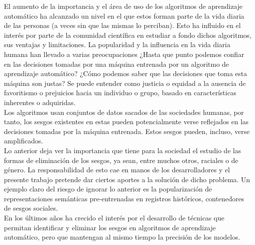 \documentclass[runningheads,a4paper]{llncs}
\begin{document}
	El aumento de la importancia y el área de uso de los algoritmos de aprendizaje automático ha alcanzado un nivel en el que estos forman parte de la vida diaria de las personas (a veces sin que las mismas lo perciban). Esto ha influido en el interés por parte de la comunidad científica en estudiar a fondo dichos algoritmos, sus ventajas y limitaciones. La popularidad y la influencia en la vida diaria humana han llevado a varias preocupaciones ¿Hasta que punto podemos confiar en las decisiones tomadas por una máquina entrenada por un algoritmo de aprendizaje automático? ¿Cómo podemos saber que las decisiones que toma esta máquina son justas? Se puede entender como justicia o equidad a la ausencia de favoritismo o prejuicios hacia un individuo o grupo, basado en características inherentes o adquiridas.\\
	Los algoritmos usan conjuntos de datos sacados de las sociedades humanas, por tanto, los sesgos existentes en estas pueden potencialmente verse reflejados en las decisiones tomadas por la máquina entrenada. Estos sesgos pueden, incluso, verse amplificados.\\
	Lo anterior deja ver la importancia que tiene para la sociedad el estudio de las formas de eliminación de los sesgos, ya sean, entre muchos otros, raciales o de género. La responsabilidad de esto cae en manos de los desarrolladores y el presente trabajo pretende dar ciertos aportes a la solución de dicho problema. Un ejemplo claro del riesgo de ignorar lo anterior es la popularización de representaciones semánticas pre-entrenadas en registros históricos, contenedores de sesgos sociales.\\
	En los últimos años ha crecido el interés por el desarrollo de técnicas que permitan identificar y eliminar los sesgos en algoritmos de aprendizaje automático, pero que mantengan al mismo tiempo la precisión de los modelos.\\
	
\end{document}
